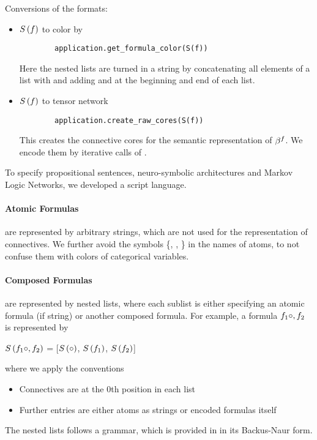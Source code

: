 Conversions of the formats:
\begin{itemize}
    \item $S\left(f\right)$ to color by
    \begin{lstlisting}
        application.get_formula_color(S(f))
    \end{lstlisting}
    Here the nested lists are turned in a string by concatenating all elements of a list with \stringof{\_} and adding \stringof{[} and \stringof{]} at the beginning and end of each list.
    \item  $S\left(f\right)$ to tensor network
    \begin{lstlisting}
        application.create_raw_cores(S(f))
    \end{lstlisting}
    This creates the connective cores for the semantic representation of $\beta^{f}$.
    We encode them by iterative calls of .
\end{itemize}


\label{subsec:scriptLanguage}

To specify propositional sentences, neuro-symbolic architectures and Markov Logic Networks, we developed a script language.


\paragraph{Atomic Formulas} are represented by arbitrary strings, which are not used for the representation of connectives.
We further avoid the symbols \{\stringof{(}, \stringof{)}, \stringof{\_}\} in the names of atoms, to not confuse them with colors of categorical variables.


\paragraph{Composed Formulas} are represented by nested lists, where each sublist is either specifying an atomic formula (if string) or another composed formula.
For example, a formula $f_1\circ,f_2$ is represented by
\begin{centeredcode}
    $S\left(f_1\circ,f_2\right)$ = [$S\left(\circ\right)$, $S\left(f_1\right)$, $S\left(f_2\right)$]
\end{centeredcode}
where we apply the conventions
\begin{itemize}
    \item Connectives are at the 0th position in each list
    \item Further entries are either atoms as strings or encoded formulas itself
\end{itemize}
The nested lists follows a grammar, which is provided in  in its Backus-Naur form.


